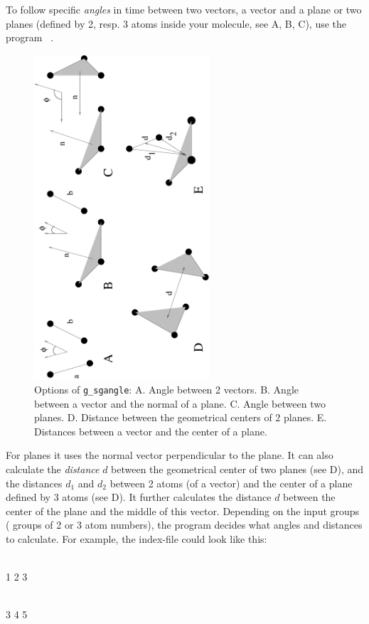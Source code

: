 {To follow specific {\em angles} in time between two vectors, a vector
and a plane or two planes (defined by 2, resp. 3 atoms inside your
molecule, see A, B, C), use the program {\tt
{}}.

\begin{figure}
\centerline{
{\includegraphics[width=6.5cm,angle=270]{plots/sgangle}}}
\caption[Options of {\tt g\_sgangle}.]{Options of {\tt g\_sgangle}: A. Angle between 2 vectors. B. Angle between a vector and the normal of a plane. C. Angle between two planes. D. Distance between the geometrical centers of 2 planes. E. Distances between a vector and the center of a plane.}
\label{fig:sgangle}
\end{figure}

For planes it uses the normal vector perpendicular to the plane.  It
can also calculate the {\em distance} $d$ between the geometrical
center of two planes (see D), and the distances
$d_1$ and $d_2$ between 2 atoms (of a vector) and the center of a
plane defined by 3 atoms (see D). It further
calculates the distance $d$ between the center of the plane and the
middle of this vector.  Depending on the input groups ({\ie} groups of
2 or 3 atom numbers), the program decides what angles and distances to
calculate. For example, the index-file could look like this:

\begin{tt}
[ a\_plane ]\\
 1     2     3\\
\end{tt}
\begin{tt}
[ a\_vector ]\\
 3     4     5\\
\end{tt}
} %

